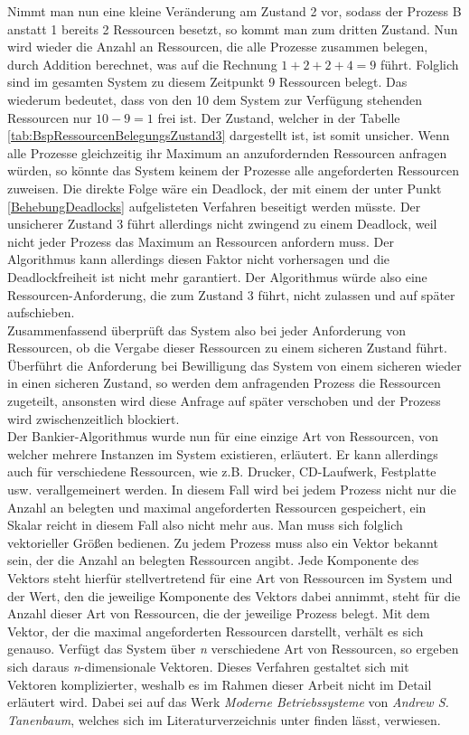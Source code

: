 \begin{description}
\begin{description}
								Nimmt man nun eine kleine Veränderung am Zustand 2 vor, sodass der Prozess B anstatt 1 bereits 2 Ressourcen besetzt, so kommt man zum dritten Zustand. Nun wird wieder die Anzahl an Ressourcen, die alle Prozesse zusammen belegen, durch Addition berechnet, was auf die Rechnung $1 + 2 + 2 + 4 = 9$ führt. Folglich sind im gesamten System zu diesem Zeitpunkt 9 Ressourcen belegt. Das wiederum bedeutet, dass von den 10 dem System zur Verfügung stehenden Ressourcen nur $10 - 9 = 1$ frei ist. Der Zustand, welcher in der Tabelle \ref{tab:BspRessourcenBelegungsZustand3} dargestellt ist, ist somit unsicher. Wenn alle Prozesse gleichzeitig ihr Maximum an anzufordernden Ressourcen anfragen würden, so könnte das System keinem der Prozesse alle angeforderten Ressourcen zuweisen. Die direkte Folge wäre ein Deadlock, der mit einem der unter Punkt \ref{BehebungDeadlocks} aufgelisteten Verfahren beseitigt werden müsste. Der unsicherer Zustand 3 führt allerdings nicht zwingend zu einem Deadlock, weil nicht jeder Prozess das Maximum an Ressourcen anfordern muss. Der Algorithmus kann allerdings diesen Faktor nicht vorhersagen und die Deadlockfreiheit ist nicht mehr garantiert. Der Algorithmus würde also eine Ressourcen-Anforderung, die zum Zustand 3 führt, nicht zulassen und auf später aufschieben. \cite{ModerneBetriebssysteme}\\
								Zusammenfassend überprüft das System also bei jeder Anforderung von Ressourcen, ob die Vergabe dieser Ressourcen zu einem sicheren Zustand führt. Überführt die Anforderung bei Bewilligung das System von einem sicheren wieder in einen sicheren Zustand, so werden dem anfragenden Prozess die Ressourcen zugeteilt, ansonsten wird diese Anfrage auf später verschoben und der Prozess wird zwischenzeitlich blockiert.\\
								Der Bankier-Algorithmus wurde nun für eine einzige Art von Ressourcen, von welcher mehrere Instanzen im System existieren, erläutert. Er kann allerdings auch für verschiedene Ressourcen, wie z.B. Drucker, CD-Laufwerk, Festplatte usw. verallgemeinert werden. In diesem Fall wird bei jedem Prozess nicht nur die Anzahl an belegten und maximal angeforderten Ressourcen gespeichert, ein Skalar reicht in diesem Fall also nicht mehr aus. Man muss sich folglich vektorieller Größen bedienen. Zu jedem Prozess muss also ein Vektor bekannt sein, der die Anzahl an belegten Ressourcen angibt. Jede Komponente des Vektors steht hierfür stellvertretend für eine Art von Ressourcen im System und der Wert, den die jeweilige Komponente des Vektors dabei annimmt, steht für die Anzahl dieser Art von Ressourcen, die der jeweilige Prozess belegt. Mit dem Vektor, der die maximal angeforderten Ressourcen darstellt, verhält es sich genauso. Verfügt das System über \textit{n} verschiedene Art von Ressourcen, so ergeben sich daraus \textit{n}-dimensionale Vektoren. Dieses Verfahren gestaltet sich mit Vektoren komplizierter, weshalb es im Rahmen dieser Arbeit nicht im Detail erläutert wird. Dabei sei auf das Werk \textit{Moderne Betriebssysteme} von \textit{Andrew S. Tanenbaum}, welches sich im Literaturverzeichnis unter \cite{ModerneBetriebssysteme} finden lässt, verwiesen.
							

\end{description}
\end{description}
